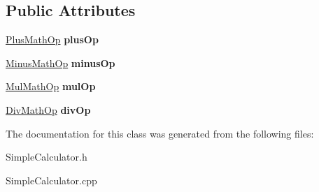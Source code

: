 \subsection*{Public Attributes}
\begin{DoxyCompactItemize}
\item 
\hypertarget{class_simple_calculator_a4d8d30bd990c0d203281bae710467047}{}\hyperlink{class_plus_math_op}{Plus\+Math\+Op} {\bfseries plus\+Op}\label{class_simple_calculator_a4d8d30bd990c0d203281bae710467047}

\item 
\hypertarget{class_simple_calculator_a5040eae51fb4c48586355e7eb32e1351}{}\hyperlink{class_minus_math_op}{Minus\+Math\+Op} {\bfseries minus\+Op}\label{class_simple_calculator_a5040eae51fb4c48586355e7eb32e1351}

\item 
\hypertarget{class_simple_calculator_a2c8040018960b251b1f9566d9ad620b8}{}\hyperlink{class_mul_math_op}{Mul\+Math\+Op} {\bfseries mul\+Op}\label{class_simple_calculator_a2c8040018960b251b1f9566d9ad620b8}

\item 
\hypertarget{class_simple_calculator_a2788f6712bb94eff9da6f7c59396e2f8}{}\hyperlink{class_div_math_op}{Div\+Math\+Op} {\bfseries div\+Op}\label{class_simple_calculator_a2788f6712bb94eff9da6f7c59396e2f8}

\end{DoxyCompactItemize}


The documentation for this class was generated from the following files\+:\begin{DoxyCompactItemize}
\item 
Simple\+Calculator.\+h\item 
Simple\+Calculator.\+cpp\end{DoxyCompactItemize}
